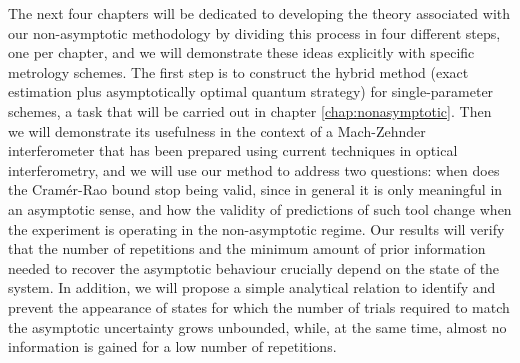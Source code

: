 The next four chapters will be dedicated to developing the theory associated with our non-asymptotic methodology by dividing this process in four different steps, one per chapter, and we will demonstrate these ideas explicitly with specific metrology schemes. The first step is to construct the hybrid method (exact estimation plus asymptotically optimal quantum strategy) for single-parameter schemes, a task that will be carried out in chapter \ref{chap:nonasymptotic}. Then we will demonstrate its usefulness in the context of a Mach-Zehnder interferometer that has been prepared using current techniques in optical interferometry, and we will use our method to address two questions: when does the Cram\'{e}r-Rao bound stop being valid, since in general it is only meaningful in an asymptotic sense, and how the validity of predictions of such tool change when the experiment is operating in the non-asymptotic regime. Our results will verify that the number of repetitions and the minimum amount of prior information needed to recover the asymptotic behaviour crucially depend on the state of the system. In addition, we will propose a simple analytical relation to identify and prevent the appearance of states for which the number of trials required to match the asymptotic uncertainty grows unbounded, while, at the same time, almost no information is gained for a low number of repetitions.

